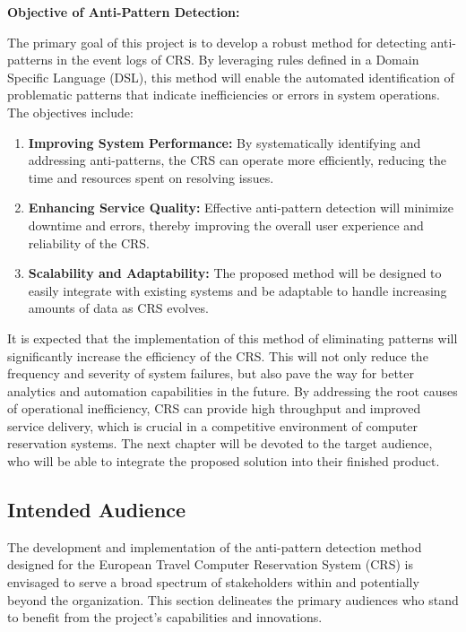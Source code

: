 \documentclass[12pt, times]{article}
\begin{document}
\textbf{Objective of Anti-Pattern Detection:}

	\hspace*{5mm}The primary goal of this project is to develop a robust method for detecting anti-patterns in the event logs of CRS. By leveraging rules defined in a Domain Specific Language (DSL), this method will enable the automated identification of problematic patterns that indicate inefficiencies or errors in system operations. The objectives include:


\begin{enumerate}
	\item \textbf{Improving System Performance:} By systematically identifying and addressing anti-patterns, the CRS can operate more efficiently, reducing the time and resources spent on resolving issues.
	\item \textbf{Enhancing Service Quality:} Effective anti-pattern detection will minimize downtime and errors, thereby improving the overall user experience and reliability of the CRS.
	\item \textbf{Scalability and Adaptability:} The proposed method will be designed to easily integrate with existing systems and be adaptable to handle increasing amounts of data as CRS evolves.
\end{enumerate}

	\hspace*{5mm}It is expected that the implementation of this method of eliminating patterns will significantly increase the efficiency of the CRS. This will not only reduce the frequency and severity of system failures, but also pave the way for better analytics and automation capabilities in the future. By addressing the root causes of operational inefficiency, CRS can provide high throughput and improved service delivery, which is crucial in a competitive environment of computer reservation systems. The next chapter will be devoted to the target audience, who will be able to integrate the proposed solution into their finished product.

\subsection{Intended Audience}
	\hspace*{5mm}The development and implementation of the anti-pattern detection method designed for the European Travel Computer Reservation System (CRS) is envisaged to serve a broad spectrum of stakeholders within and potentially beyond the organization. This section delineates the primary audiences who stand to benefit from the project's capabilities and innovations. 
	
\end{document}
